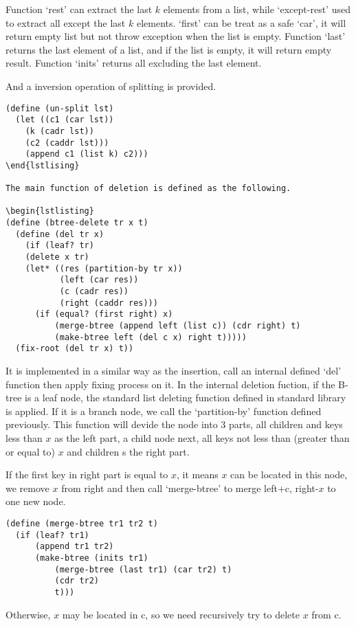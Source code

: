 \documentclass{article}
\begin{document}
Function `rest' can extract the last $k$ elements from a list, while
`except-rest' used to extract all except the last $k$ elements.
`first' can be treat as a safe `car', it will return empty list but not
throw exception when the list is empty. Function `last' returns the
last element of a list, and if the list is empty, it will return 
empty result. Function `inits' returns all excluding the last element.

And a inversion operation of splitting is provided.

\begin{lstlisting}
(define (un-split lst)
  (let ((c1 (car lst))
	(k (cadr lst))
	(c2 (caddr lst)))
    (append c1 (list k) c2)))
\end{lstlising}

The main function of deletion is defined as the following.

\begin{lstlisting}
(define (btree-delete tr x t)
  (define (del tr x)
    (if (leaf? tr)
	(delete x tr)
	(let* ((res (partition-by tr x))
	       (left (car res))
	       (c (cadr res))
	       (right (caddr res)))
	  (if (equal? (first right) x)
	      (merge-btree (append left (list c)) (cdr right) t)
	      (make-btree left (del c x) right t)))))
  (fix-root (del tr x) t))
\end{lstlisting}

It is implemented in a similar way as the insertion, call an internal
defined `del' function then apply fixing process on it. In the internal
deletion fuction, if the B-tree is a leaf node, the standard list
deleting function defined in standard library is applied. If it is
a branch node, we call the `partition-by' function defined previously.
This function will devide the node into 3 parts, all children and
keys less than $x$ as the left part, a child node next, all keys not less
than (greater than or equal to) $x$ and children s the right part.

If the first key in right part is equal to $x$, it means $x$ can
be located in this node, we remove $x$ from right and then
call `merge-btree' to merge left+c, right-$x$ to one new node.

\begin{lstlisting}
(define (merge-btree tr1 tr2 t)
  (if (leaf? tr1)
      (append tr1 tr2)
      (make-btree (inits tr1)
		  (merge-btree (last tr1) (car tr2) t)
		  (cdr tr2)
		  t)))
\end{lstlisting}

Otherwise, $x$ may be located in c, so we need recursively try
to delete $x$ from c.
\end{document}
